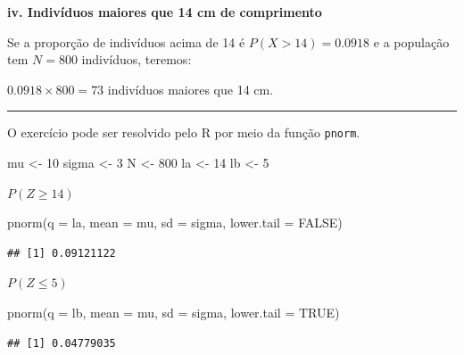 \documentclass[
]{book}
\newenvironment{Shaded}{\begin{snugshade}}{\end{snugshade}}
\newcommand{\AttributeTok}[1]{\textcolor[rgb]{0.77,0.63,0.00}{#1}}
\newcommand{\ConstantTok}[1]{\textcolor[rgb]{0.00,0.00,0.00}{#1}}
\newcommand{\DecValTok}[1]{\textcolor[rgb]{0.00,0.00,0.81}{#1}}
\newcommand{\FunctionTok}[1]{\textcolor[rgb]{0.00,0.00,0.00}{#1}}
\newcommand{\NormalTok}[1]{#1}
\newcommand{\OtherTok}[1]{\textcolor[rgb]{0.56,0.35,0.01}{#1}}
\begin{document}
\textbf{iv. Indivíduos maiores que 14 cm de comprimento}

Se a proporção de indivíduos acima de 14 é \(P(X > 14) = 0.0918\) e a população tem \(N = 800\) indivíduos, teremos:

\(0.0918 \times 800 = 73\) indivíduos maiores que 14 cm.

\begin{center}\rule{0.5\linewidth}{0.5pt}\end{center}

O exercício pode ser resolvido pelo R por meio da função \texttt{pnorm}.

\begin{Shaded}
\begin{Highlighting}[]
\NormalTok{mu }\OtherTok{\textless{}{-}} \DecValTok{10}
\NormalTok{sigma }\OtherTok{\textless{}{-}} \DecValTok{3}
\NormalTok{N }\OtherTok{\textless{}{-}} \DecValTok{800}
\NormalTok{la }\OtherTok{\textless{}{-}} \DecValTok{14}
\NormalTok{lb }\OtherTok{\textless{}{-}} \DecValTok{5}
\end{Highlighting}
\end{Shaded}

\(P(Z \ge 14)\)

\begin{Shaded}
\begin{Highlighting}[]
\FunctionTok{pnorm}\NormalTok{(}\AttributeTok{q =}\NormalTok{ la, }\AttributeTok{mean =}\NormalTok{ mu, }\AttributeTok{sd =}\NormalTok{ sigma, }\AttributeTok{lower.tail =} \ConstantTok{FALSE}\NormalTok{)}
\end{Highlighting}
\end{Shaded}

\begin{verbatim}
## [1] 0.09121122
\end{verbatim}

\(P(Z \le 5)\)

\begin{Shaded}
\begin{Highlighting}[]
\FunctionTok{pnorm}\NormalTok{(}\AttributeTok{q =}\NormalTok{ lb, }\AttributeTok{mean =}\NormalTok{ mu, }\AttributeTok{sd =}\NormalTok{ sigma, }\AttributeTok{lower.tail =} \ConstantTok{TRUE}\NormalTok{)}
\end{Highlighting}
\end{Shaded}

\begin{verbatim}
## [1] 0.04779035
\end{verbatim}
\end{document}
